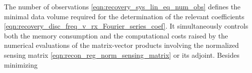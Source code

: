 The number of
observations
\eqref{eqn:recovery_sys_lin_eq_num_obs} defines
the minimal data volume required for
the determination of
the relevant  coefficients
\eqref{eqn:recovery_disc_freq_v_rx_Fourier_series_coef}. %
It simultaneously controls both
the memory consumption and
the computational costs raised by
the numerical evaluations of
the matrix-vector products involving
the normalized sensing matrix
\eqref{eqn:recon_reg_norm_sensing_matrix} or
its adjoint.
Besides minimizing
